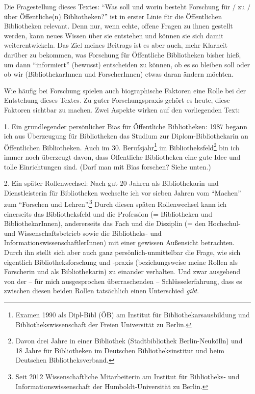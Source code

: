 \documentclass[a4paper,
fontsize=11pt,
oneside,
numbers=noperiodatend,
parskip=half-,
bibliography=totoc,
final
]{scrartcl}
\begin{document}
Die Fragestellung dieses Textes: \enquote{Was soll und worin besteht
Forschung für / zu / über Öffentliche(n) Bibliotheken?} ist in erster
Linie für die Öffentlichen Bibliotheken relevant. Denn nur, wenn echte,
offene Fragen zu ihnen gestellt werden, kann neues Wissen über sie
entstehen und können sie sich damit weiterentwickeln. Das Ziel meines
Beitrags ist es aber auch, mehr Klarheit darüber zu bekommen, was
Forschung für Öffentliche Bibliotheken bisher hieß, um dann
\enquote{informiert} (bewusst) entscheiden zu können, ob es so bleiben
soll oder ob wir (BibliothekarInnen und ForscherInnen) etwas daran
ändern möchten.

Wie häufig bei Forschung spielen auch biographische Faktoren eine Rolle
bei der Entstehung dieses Textes. Zu guter Forschungspraxis gehört es
heute, diese Faktoren sichtbar zu machen. Zwei Aspekte wirken auf den
vorliegenden Text:

1. Ein grundlegender persönlicher Bias für Öffentliche Bibliotheken:
1987 begann ich aus Überzeugung für Bibliotheken das Studium zur
Diplom-Bibliothekarin an Öffentlichen Bibliotheken. Auch im 30.
Berufsjahr\footnote{Examen 1990 als Dipl-Bibl (ÖB) am Institut für
  Bibliothekarsausbildung und Bibliothekswissenschaft der Freien
  Universität zu Berlin.} im Bibliotheksfeld\footnote{Davon drei Jahre
  in einer Bibliothek (Stadtbibliothek Berlin-Neukölln) und 18 Jahre für
  Bibliotheken im Deutschen Bibliotheksinstitut und beim Deutschen
  Bibliotheksverband.} bin ich immer noch überzeugt davon, dass
Öffentliche Bibliotheken eine gute Idee und tolle Einrichtungen sind.
(Darf man mit Bias forschen? Siehe unten.)

2. Ein später Rollenwechsel: Nach gut 20 Jahren als Bibliothekarin und
Dienstleisterin für Bibliotheken wechselte ich vor sieben Jahren vom
\enquote{Machen} zum \enquote{Forschen und Lehren}.\footnote{Seit 2012
  Wissenschaftliche Mitarbeiterin am Institut für Bibliotheks- und
  Informationswissenschaft der Humboldt-Universität zu Berlin.} Durch
diesen späten Rollenwechsel kann ich einerseits das Bibliotheksfeld und
die Profession (= Bibliotheken und BibliothekarInnen), andererseits das
Fach und die Disziplin (= den Hochschul-und Wissenschaftsbetrieb sowie
die Bibliotheks- und InformationswissenschaftlerInnen) mit einer
gewissen Außensicht betrachten. Durch ihn stellt sich aber auch ganz
persönlich-unmittelbar die Frage, wie sich eigentlich
Bibliotheksforschung und -praxis (beziehungsweise meine Rollen als
Forscherin und als Bibliothekarin) zu einander verhalten. Und zwar
ausgehend von der -- für mich ausgesprochen überraschenden --
Schlüsselerfahrung, dass es zwischen diesen beiden Rollen tatsächlich
einen Unterschied \emph{gibt}.
\end{document}
